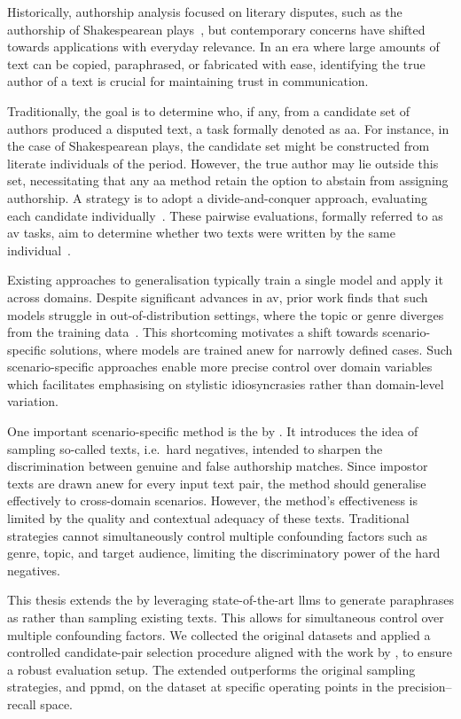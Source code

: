 Historically, authorship analysis focused on literary disputes, such as the authorship of Shakespearean plays~\citep{neal_surveying_2018,stamatatos_survey_2009}, but contemporary concerns have shifted towards applications with everyday relevance.
In an era where large amounts of text can be copied, paraphrased, or fabricated with ease, identifying the true author of a text is crucial for maintaining trust in communication. 

Traditionally, the goal is to determine who, if any, from a candidate set of authors produced a disputed text, a task formally denoted as \ac{aa}. 
For instance, in the case of Shakespearean plays, the candidate set might be constructed from literate individuals of the period.
However, the true author may lie outside this set, necessitating that any \ac{aa} method retain the option to abstain from assigning authorship. 
A strategy is to adopt a divide-and-conquer approach, evaluating each candidate individually~\citep{tyo_state_2022,barlas_cross_domain_2020}. 
These pairwise evaluations, formally referred to as \ac{av} tasks, aim to determine whether two texts were written by the same individual~\citep{koppel_authorship_2004}. 

Existing approaches to generalisation typically train a single model and apply it across domains.
Despite significant advances in \ac{av}, prior work finds that such models struggle in out-of-distribution settings, where the topic or genre diverges from the training data~\citep{Sundararajan_style_18,bischoff_importance_2020,li_learning_2025}. 
This shortcoming motivates a shift towards scenario-specific solutions, where models are trained anew for narrowly defined cases. 
Such scenario-specific approaches enable more precise control over domain variables which facilitates emphasising on stylistic idiosyncrasies rather than domain-level variation.

One important scenario-specific method is the \impAppr{} by \citet{koppel_determining_2014}.
It introduces the idea of sampling so-called \imp{} texts, i.e.\ hard negatives, intended to sharpen the discrimination between genuine and false authorship matches. 
Since impostor texts are drawn anew for every input text pair, the method should generalise effectively to cross-domain scenarios.
However, the method's effectiveness is limited by the quality and contextual adequacy of these \imp{} texts. 
Traditional strategies cannot simultaneously control multiple confounding factors such as genre, topic, and target audience, limiting the discriminatory power of the hard negatives.

This thesis extends the \impAppr{} by leveraging state-of-the-art \acp{llm} to generate paraphrases as \imps{} rather than sampling existing texts.
This allows for simultaneous control over multiple confounding factors.
We collected the original datasets and applied a controlled candidate-pair selection procedure aligned with the work by \citet{koppel_determining_2014}, to ensure a robust evaluation setup.
The extended \impAppr{} outperforms the original sampling strategies, \unmasking{} and \acs{ppmd}, on the \dataStudent{} dataset at specific operating points in the precision–recall space.
